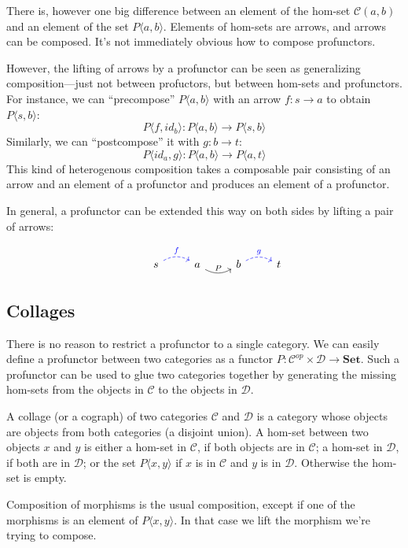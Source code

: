 \documentclass[DaoFP]{subfiles}
\begin{document}
There is, however one big difference between an element of the hom-set $ \mathcal{C}(a, b)$ and an element of the set $P\langle a, b \rangle$. Elements of hom-sets are arrows, and arrows can be composed. It's not immediately obvious how to compose profunctors. 

However, the lifting of arrows by a profunctor can be seen as generalizing composition---just not between profuctors, but between hom-sets and profunctors. For instance, we can ``precompose'' $P \langle a, b \rangle$ with an arrow $f \colon s \to a$ to obtain $P \langle s, b \rangle$:
\[ P\langle f, id_b \rangle \colon P \langle a, b \rangle \to P \langle s, b \rangle \]
Similarly, we can ``postcompose'' it with $g \colon b \to t$:
\[ P \langle id_a, g \rangle \colon P \langle a, b \rangle \to P \langle a, t \rangle \]
This kind of heterogenous composition takes a composable pair consisting of an arrow and an element of a profunctor and produces an element of a profunctor.

In general, a profunctor can be extended this way on both sides by lifting a pair of arrows:

\[
 \begin{tikzcd}
  & s
  \arrow[r, bend left, dashed, blue, "f"]
 & a
 \arrow[r, bend right, "P"]
 & b
  \arrow[r, bend left, dashed, blue, "g"]
 &  t
  \end{tikzcd}
\]

\subsection{Collages}

There is no reason to restrict a profunctor to a single category. We can easily define a profunctor between two categories as a functor $ P \colon \mathcal{C}^{op} \times  \mathcal{D} \to \mathbf{Set}$. Such a profunctor can be used to glue two categories together by generating the missing hom-sets from the objects in $\mathcal{C}$ to the objects in $\mathcal{D}$. 

A collage (or a cograph) of two categories $\mathcal{C}$ and $\mathcal{D}$ is a category whose objects are objects from both categories (a disjoint union). A hom-set between two objects $x$ and $y$ is either a hom-set in $\mathcal{C}$, if both objects are in $\mathcal{C}$; a hom-set in $\mathcal{D}$, if both are in $\mathcal{D}$; or the set $P \langle x, y\rangle$ if $x$ is in $\mathcal{C}$ and $y$ is in $\mathcal{D}$. Otherwise the hom-set is empty. 

Composition of morphisms is the usual composition, except if one of the morphisms is an element of $P \langle x, y \rangle$. In that case we lift the morphism we're trying to compose. 
\end{document}

